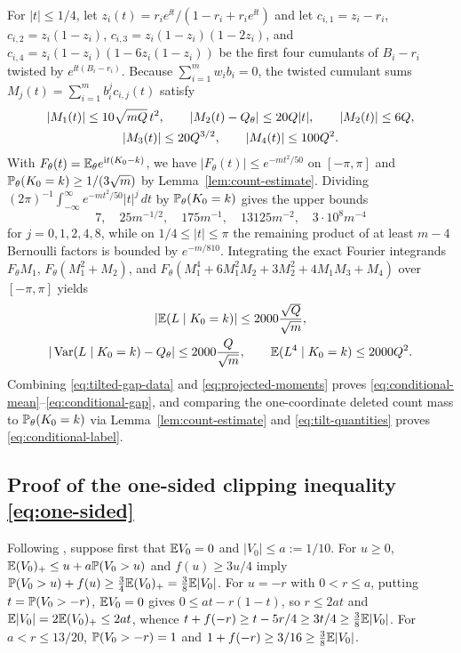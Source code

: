 For $|t|\le1/4$, let $z_i(t)=r_ie^{\ii t}/(1-r_i+r_ie^{\ii t})$ and let
$c_{i,1}=z_i-r_i$, $c_{i,2}=z_i(1-z_i)$, $c_{i,3}=z_i(1-z_i)(1-2z_i)$, and
$c_{i,4}=z_i(1-z_i)(1-6z_i(1-z_i))$ be the first four cumulants of $B_i-r_i$
twisted by $e^{\ii t(B_i-r_i)}$. Because $\sum_{i=1}^mw_ib_i=0$, the twisted
cumulant sums $M_j(t)=\sum_{i=1}^mb_i^jc_{i,j}(t)$ satisfy
\begin{gather}
 |M_1(t)|\le10\sqrt{mQ}\,t^2,\qquad
 |M_2(t)-Q_\theta|\le20Q|t|,\qquad |M_2(t)|\le6Q,\notag\\
 |M_3(t)|\le20Q^{3/2},\qquad |M_4(t)|\le100Q^2.              \label{eq:complex-moments}
\end{gather}
With $F_\theta(t)=\mathbb E_\theta e^{\mathrm i t(K_0-k)}$, we have $|F_\theta(t)|\le e^{-mt^2/50}$
on $[-\pi,\pi]$ and $\mathbb P_\theta(K_0=k)\ge1/(3\sqrt m)$ by Lemma~\ref{lem:count-estimate}.
Dividing $(2\pi)^{-1}\int_{-\infty}^\infty e^{-mt^2/50}|t|^j\,dt$ by
$\mathbb P_\theta(K_0=k)$ gives the upper bounds
\begin{equation}\label{eq:gaussian-moment-table}
             7,\quad 25m^{-1/2},\quad 175m^{-1},\quad
                          13125m^{-2},\quad 3\cdot10^8m^{-4}
\end{equation}
for $j=0,1,2,4,8$, while on $1/4\le|t|\le\pi$ the remaining product of at
least $m-4$ Bernoulli factors is bounded by $e^{-m/810}$. Integrating the
exact Fourier integrands $F_\theta M_1$, $F_\theta(M_1^2+M_2)$, and
$F_\theta(M_1^4+6M_1^2M_2+3M_2^2+4M_1M_3+M_4)$ over $[-\pi,\pi]$ yields
\begin{equation}\label{eq:projected-moments}
 \begin{gathered}
 |\mathbb E(L\mid K_0=k)|\le2000\frac{\sqrt Q}{\sqrt m},\\
 |\operatorname{Var}(L\mid K_0=k)-Q_\theta|\le2000\frac{Q}{\sqrt m},
 \qquad \mathbb E(L^4\mid K_0=k)\le2000Q^2.
 \end{gathered}
\end{equation}
Combining \eqref{eq:tilted-gap-data} and \eqref{eq:projected-moments} proves
\eqref{eq:conditional-mean}--\eqref{eq:conditional-gap}, and comparing the
one-coordinate deleted count mass to $\mathbb P_\theta(K_0=k)$ via
Lemma~\ref{lem:count-estimate} and \eqref{eq:tilt-quantities} proves
\eqref{eq:conditional-label}.

\subsection{Proof of the one-sided clipping inequality \eqref{eq:one-sided}}

Following \citet[Lemma~3.2 and equation~(83)]{HeCheng2026}, suppose first
that $\mathbb E V_0=0$ and $|V_0|\le a:=1/10$. For $u\ge0$,
$\mathbb E(V_0)_+\le u+a\mathbb P(V_0>u)$ and $f(u)\ge3u/4$ imply
$\mathbb P(V_0>u)+f(u)\ge\frac34\mathbb E(V_0)_+=\frac38\mathbb E|V_0|$. For $u=-r$ with
$0<r\le a$, putting $t=\mathbb P(V_0>-r)$, $\mathbb E V_0=0$ gives $0\le at-r(1-t)$, so
$r\le2at$ and $\mathbb E|V_0|=2\mathbb E(V_0)_+\le2at$, whence
$t+f(-r)\ge t-5r/4\ge3t/4\ge\frac38\mathbb E|V_0|$. For $a<r\le13/20$,
$\mathbb P(V_0>-r)=1$ and $1+f(-r)\ge3/16\ge\frac38\mathbb E|V_0|$.

